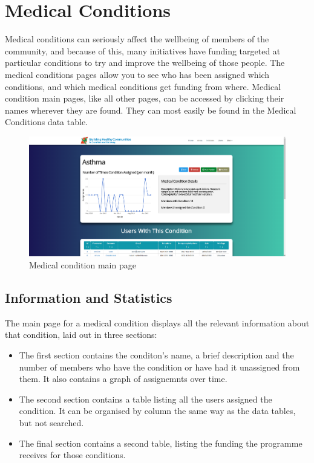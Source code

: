 \documentclass{bhcguides}
\begin{document}
\pagebreak

\section{Medical Conditions}
\label{sec:medical}

Medical conditions can seriously affect the wellbeing of members of the community, and because of this, many initiatives have funding targeted at particular conditions to try and improve the wellbeing of those people. The medical conditions pages allow you to see who has been assigned which conditions, and which medical conditions get funding from where. Medical condition main pages, like all other pages, can be accessed by clicking their names wherever they are found. They can most easily be found in the Medical Conditions data table.

\begin{figure}[h]
 \centerline{\includegraphics[width=\textwidth, height=\textheight, keepaspectratio]{medicalmainpage.png}}
 \caption{Medical condition main page}
 \label{fig:medicalMainPage}
\end{figure}

\subsection{Information and Statistics}
\label{ssec:medinfoandstats}

The main page for a medical condition displays all the relevant information about that condition, laid out in three sections:

\begin{itemize}
	\item The first section contains the conditon's name, a brief description and the number of members who have the condition or have had it unassigned from them. It also contains a graph of assignemnts over time.
	\item The second section contains a table listing all the users assigned the condition. It can be organised by column the same way as the data tables, but not searched.
	\item The final section contains a second table, listing the funding the programme receives for those conditions.
\end{itemize}
\end{document}
